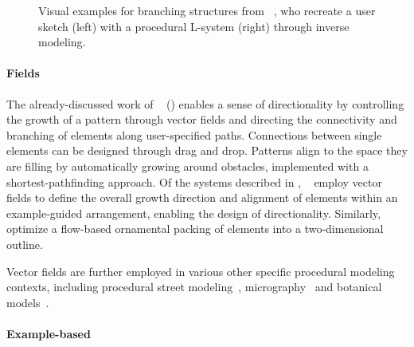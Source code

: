 \begin{figure}[t]
    \centering
    \caption{\label{fig:guo_2020_ipm} Visual examples for branching structures from \citeauthor*{guo_2020_ipm}~\cite{guo_2020_ipm}, who recreate a user sketch (left) with a procedural L-system (right) through inverse modeling.}
\end{figure}

\paragraph*{Fields}
The already-discussed work of \citeauthor*{gieseke_2017_ooo}~\cite{gieseke_2017_ooo} () enables a sense of directionality by controlling the growth of a pattern through vector fields and directing the connectivity and branching of elements along user-specified paths. Connections between single elements can be designed through drag and drop. Patterns align to the space they are filling by automatically growing around obstacles, implemented with a shortest-pathfinding approach. Of the systems described in  , \citeauthor*{ijiri_2008_aeb}~\cite{ijiri_2008_aeb} employ vector fields to define the overall growth direction and alignment of elements within an example-guided arrangement, enabling the design of directionality. Similarly, \citeauthor*{saputra_2017_ffo}~\cite{saputra_2017_ffo} optimize a flow-based ornamental packing of elements into a two-dimensional outline. 

Vector fields are further employed in various other specific procedural modeling contexts, including procedural street modeling~\cite{chen_2008_ips}, micrography~\cite{maharik_2011_dm} and botanical models~\cite{xu_2015_ptm}.

\paragraph*{Example-based}

